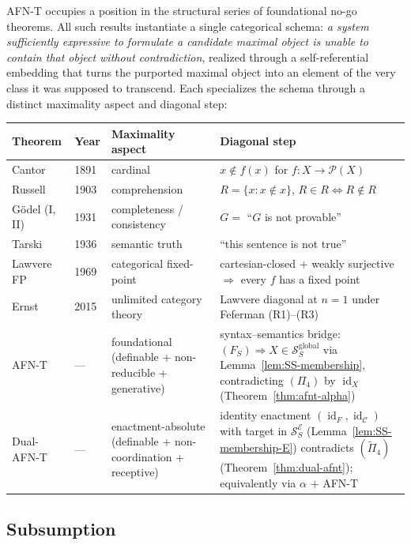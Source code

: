 \documentclass[11pt]{article}
\theoremstyle{plain}
\theoremstyle{definition}
\newcommand{\cS}{\mathcal{S}}
\newcommand{\cC}{\mathcal{C}}
\newcommand{\cP}{\mathcal{P}}
\newcommand{\cE}{\mathcal{E}}
\newcommand{\SSE}{\cS_{S}^{\cE}}
\DeclareMathOperator{\id}{id}
\begin{document}
AFN-T occupies a position in the structural series of foundational no-go theorems. All such results instantiate a single categorical schema: \emph{a system sufficiently expressive to formulate a candidate maximal object is unable to contain that object without contradiction}, realized through a self-referential embedding that turns the purported maximal object into an element of the very class it was supposed to transcend. Each specializes the schema through a distinct maximality aspect and diagonal step:

\begin{center}
\begin{tabular}{@{}l l p{3.2cm} p{5.7cm}@{}}
\toprule
Theorem & Year & Maximality aspect & Diagonal step \\ \midrule
Cantor~\cite{Cantor1891} & 1891 & cardinal & $x \notin f(x)$ for $f : X \to \cP(X)$ \\
Russell~\cite{Russell1903} & 1903 & comprehension & $R = \{x : x \notin x\}$, $R \in R \iff R \notin R$ \\
G\"odel (I, II)~\cite{Godel1931} & 1931 & completeness / consistency & $G = $ ``$G$ is not provable'' \\
Tarski~\cite{Tarski1936} & 1936 & semantic truth & ``this sentence is not true'' \\
Lawvere FP~\cite{Lawvere1969} & 1969 & categorical fixed-point & cartesian-closed + weakly surjective $\Rightarrow$ every $f$ has a fixed point \\
Ernst~\cite{Ernst2015} & 2015 & unlimited category theory & Lawvere diagonal at $n = 1$ under Feferman (R1)--(R3) \\
AFN-T & --- & foundational (definable + non-reducible + generative) & syntax--semantics bridge: $(F_S) \Rightarrow X \in \cS_S^{\mathrm{global}}$ via Lemma~\ref{lem:SS-membership}, contradicting $(\Pi_4)$ by $\id_X$ (Theorem~\ref{thm:afnt-alpha}) \\
Dual-AFN-T & --- & enactment-absolute (definable + non-coordination + receptive) & identity enactment $(\id_F, \id_\cC)$ with target in $\SSE$ (Lemma~\ref{lem:SS-membership-E}) contradicts $(\tilde{\Pi}_4)$ (Theorem~\ref{thm:dual-afnt}); equivalently via $\alpha$ + AFN-T \\
\bottomrule
\end{tabular}
\end{center}

\subsection{Subsumption}
\end{document}
